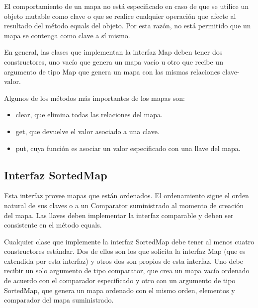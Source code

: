 \documentclass[11pt]{article}
\begin{document}
El comportamiento de un mapa no está especificado en caso de que se 
utilice un objeto mutable como clave o que se realice cualquier 
operación que afecte al resultado del método equals del objeto. Por 
esta razón, no está permitido que un mapa se contenga como clave a sí 
mismo.

\par

En general, las clases que implementan la interfaz Map deben tener 
dos constructores, uno vacío que genera un mapa vacío u otro que 
recibe un argumento de tipo Map que genera un mapa con las mismas 
relaciones clave-valor.

\par

Algunos de los métodos más importantes de los mapas son:

\begin{itemize}

\item clear, que elimina todas las relaciones del mapa.

\item get, que devuelve el valor asociado a una clave.

\item put, cuya función es asociar un valor especificado con una 
llave del mapa.

\end{itemize}

\subsection{Interfaz SortedMap}

\par

Esta interfaz provee mapas que están ordenados. El ordenamiento sigue 
el orden natural de sus claves o a un Comparator suministrado al 
momento de creación del mapa. Las llaves deben implementar la 
interfaz comparable y deben ser consistente en el método equals.
\par
Cualquier clase que implemente la interfaz SortedMap debe tener al 
menos cuatro constructores estándar. Dos de ellos son los que 
solicita la interfaz Map (que es extendida por esta interfaz) y otros 
dos son propios de esta interfaz. Uno debe recibir un solo argumento 
de tipo comparator, que crea un mapa vacío ordenado de acuerdo con el 
comparador especificado y otro con un argumento de tipo 
SortedMap, que genera un mapa ordenado con el mismo orden, elementos 
y comparador del mapa suministrado.
\end{document}
